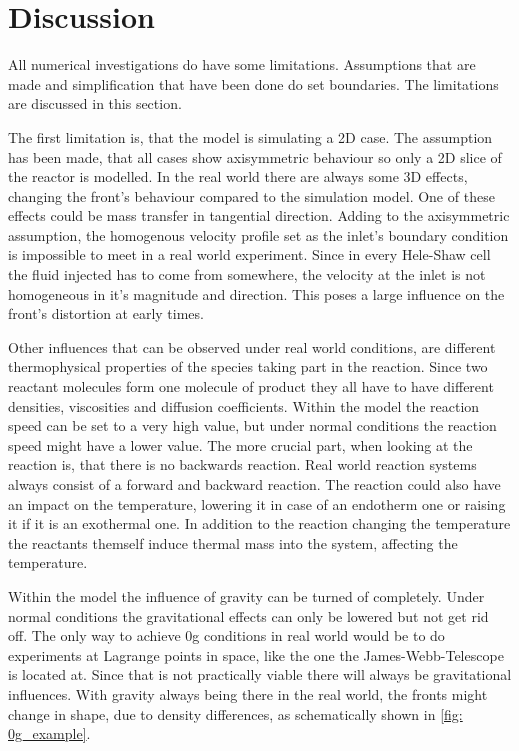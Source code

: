 \documentclass[../thesis.tex]{subfiles}
\begin{document}
\chapter{Discussion}
\label{chp: dicus}
All numerical investigations do have some limitations. Assumptions that are made and simplification that have been done do set boundaries. The limitations are discussed in this section.

The first limitation is, that the model is simulating a 2D case. The assumption has been made, that all cases show axisymmetric behaviour so only a 2D slice of the reactor is modelled. In the real world there are always some 3D effects, changing the front's behaviour compared to the simulation model. One of these effects could be mass transfer in tangential direction. Adding to the axisymmetric assumption, the homogenous velocity profile set as the inlet's boundary condition is impossible to meet in a real world experiment. Since in every Hele-Shaw cell the fluid injected has to come from somewhere, the velocity at the inlet is not homogeneous in it's magnitude and direction. This poses a large influence on the front's distortion at early times. 

Other influences that can be observed under real world conditions, are different thermophysical properties of the species taking part in the reaction. Since two reactant molecules form one molecule of product they all have to have different densities, viscosities and diffusion coefficients. Within the model the reaction speed can be set to a very high value, but under normal conditions the reaction speed might have a lower value. The more crucial part, when looking at the reaction is, that there is no backwards reaction. Real world reaction systems always consist of a forward and backward reaction. The reaction could also have an impact on the temperature, lowering it in case of an endotherm one or raising it if it is an exothermal one. In addition to the reaction changing the temperature the reactants themself induce thermal mass into the system, affecting the temperature.

Within the model the influence of gravity can be turned of completely. Under normal conditions the gravitational effects can only be lowered but not get rid off. The only way to achieve 0g conditions in real world would be to do experiments at Lagrange points in space, like the one the James-Webb-Telescope is located at. Since that is not practically viable there will always be gravitational influences. With gravity always being there in the real world, the fronts might change in shape, due to density differences, as schematically shown in \autoref{fig: 0g_example}.
\end{document}

